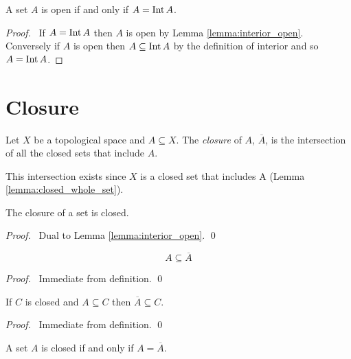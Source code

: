 \begin{lemma}
    \label{lemma:open_interior}
    A set $A$ is open if and only if $A = \operatorname{Int} A$.
\end{lemma}

\begin{proof}
    \pf\ If $A = \operatorname{Int} A$ then $A$ is open by Lemma \ref{lemma:interior_open}. Conversely if
    $A$ is open then $A \subseteq \operatorname{Int} A$ by the definition of interior and so $A = \operatorname{Int} A$.
\end{proof}

\section{Closure}

\begin{definition}[Closure]
    Let $X$ be a topological space and $A \subseteq X$. The \emph{closure} of $A$, $\overline{A}$, is the
    intersection of all the closed sets that include $A$.
\end{definition}

This intersection exists since $X$ is a closed set that includes A (Lemma \ref{lemma:closed_whole_set}).

\begin{lemma}
    The closure of a set is closed.
\end{lemma}

\begin{proof}
    \pf\ Dual to Lemma \ref{lemma:interior_open}. \qed
\end{proof}

\begin{lemma}
    \label{lemma:closure_subset}
    \[ A \subseteq \overline{A} \]
\end{lemma}

\begin{proof}
    \pf\ Immediate from definition. \qed
\end{proof}

\begin{lemma}
    If $C$ is closed and $A \subseteq C$ then $\overline{A} \subseteq C$.
\end{lemma}

\begin{proof}
    \pf\ Immediate from definition. \qed
\end{proof}

\begin{lemma}
    \label{lemma:closure_closed}
    A set $A$ is closed if and only if $A = \overline{A}$.
\end{lemma}

